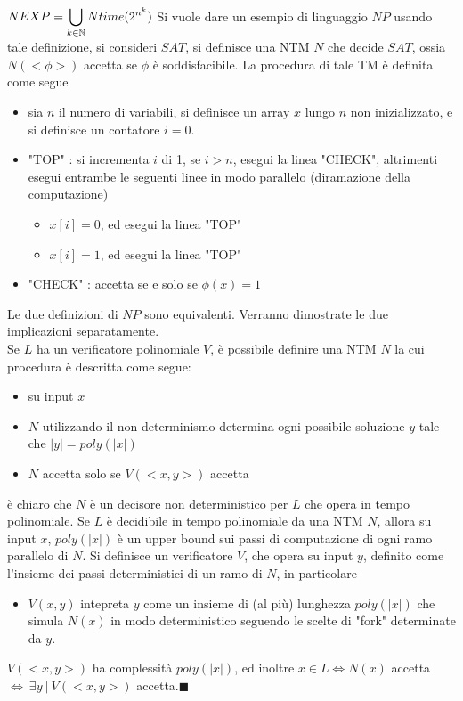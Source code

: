 \documentclass[10pt, letterpaper]{report}
\begin{document}
 $\displaystyle NEXP=\bigcup_{k\in{\mathbb N}}Ntime(2^{n^k})$
Si vuole dare un esempio di linguaggio $NP$ usando tale definizione, si consideri $SAT$, si definisce una NTM $N$ che decide $SAT$, ossia $N(<\phi>)$ accetta se $\phi$ è soddisfacibile. La procedura di tale TM è definita come segue\begin{itemize}
    \item sia $n$ il numero di variabili, si definisce un array $x$ lungo $n$ non inizializzato, e si definisce un contatore $i=0$. 
    \item "TOP" : si incrementa $i$ di 1, se $i>n$, esegui la linea "CHECK", altrimenti esegui entrambe le seguenti linee in modo parallelo (diramazione della computazione)\begin{itemize}
        \item $x[i]=0$, ed esegui la linea "TOP"
        \item $x[i]=1$, ed esegui la linea "TOP"
    \end{itemize}
    \item "CHECK" : accetta se e solo se $\phi(x)=1$
\end{itemize}
\teo{} Le due definizioni di $NP$ sono equivalenti.\acc 
\dimo{} Verranno dimostrate le due implicazioni separatamente.\\ 
\boxedMath{$\implies$} Se $L$ ha un verificatore polinomiale $V$, è possibile definire una NTM $N$ la cui procedura è descritta come segue:\begin{itemize}
    \item su input $x$
    \item $N$ utilizzando il non determinismo determina ogni possibile soluzione $y$ tale che $|y|=poly(|x|)$
    \item $N$ accetta solo se $V(<x,y>)$ accetta 
\end{itemize}
è chiaro che $N$ è un decisore non deterministico per $L$ che opera in tempo polinomiale.\acc 
\boxedMath{$\impliedby$} Se $L$ è decidibile in tempo polinomiale da una NTM $N$, allora su input $x$, $poly(|x|)$ è un upper bound sui passi di computazione di ogni ramo parallelo di $N$. Si definisce un verificatore $V$, che opera su input $y$, definito come l'insieme dei passi deterministici di un ramo di $N$, in particolare\begin{itemize}
    \item $V(x,y)$ intepreta $y$ come un insieme di (al più) lunghezza $poly(|x|)$ che simula $N(x)$ in modo deterministico seguendo le scelte di "fork" determinate da $y$. 
\end{itemize}
$V(<x,y>)$ ha complessità $poly(|x|)$, ed inoltre $x\in L \iff N(x)$ accetta $\iff \ \exists y \ | \ V(<x,y>)$  accetta.\hfill$\blacksquare$\acc   
\flowerLine 
\end{document}
